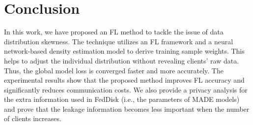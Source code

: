 \documentclass[journal]{IEEEtai}
\newcommand{\MethodnameShort}{FedDisk}
\begin{document}





\section{Conclusion}
\label{sec:conclusion}
In this work, we have proposed an FL method to tackle the issue of data distribution skewness. The technique utilizes an FL framework and a neural network-based density estimation model to derive training sample weights. This helps to adjust the individual distribution without revealing clients' raw data. Thus, the global model loss is converged faster and more accurately. The experimental results show that the proposed method improves FL accuracy and significantly reduces communication costs. We also provide a privacy analysis for the extra information used in \MethodnameShort{} (i.e., the parameters of MADE models) and prove that the leakage information becomes less important when the number of clients increases. 



\end{document}
